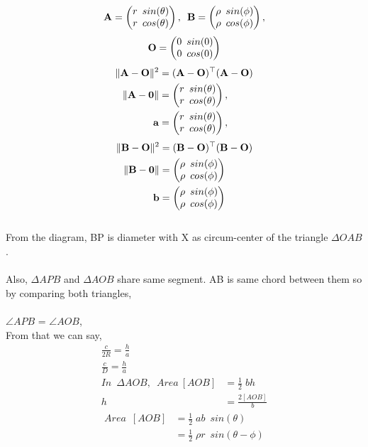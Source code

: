 \documentclass[journal,12pt,twocolumn]{IEEEtran}
\begin{document}
\begin{align}
\mathbf{A} = \begin{pmatrix}r\;\: sin(\theta)\\r \;\: cos(\theta)\end{pmatrix}, \;\: \nonumber \mathbf{B} =\begin{pmatrix}\rho \;\:  sin(\phi)\\\rho \;\: cos(\phi)\end{pmatrix}, \nonumber
\end{align}
\begin{align}
\mathbf{O} =\begin{pmatrix}0\;\: sin(0)\\0\;\: cos(0)\end{pmatrix} \nonumber
\end{align}
\begin{align}
\lVert\mathbf{A}-\mathbf{O}\rVert^2 &= (\mathbf{A}-\mathbf{O})^\top (\mathbf{A}-\mathbf{O}) \nonumber \\
\lVert\mathbf{A-0}\rVert &= \begin{pmatrix}r\;\: sin(\theta)\\r \;\: cos(\theta)\end{pmatrix}, \nonumber \\
\mathbf{a} &= \begin{pmatrix}r\;\: sin(\theta)\\r \;\: cos(\theta)\end{pmatrix}, \nonumber
\end{align}
\begin{align}
\lVert\mathbf{B}-\mathbf{O}\rVert^2 &= (\mathbf{B}-\mathbf{O})^\top (\mathbf{B}-\mathbf{O}) \nonumber \\
\lVert\mathbf{B-0}\rVert &= \begin{pmatrix}\rho \;\:  sin(\phi)\\\rho \;\: cos(\phi)\end{pmatrix} \nonumber \\
\mathbf{b} &= \begin{pmatrix}\rho \;\:  sin(\phi)\\\rho \;\: cos(\phi)\end{pmatrix} \nonumber
\end{align}\\
From the diagram, BP is diameter with X as circum-center of the triangle $\Delta OAB $.\\ \\
Also, $\Delta APB $ and $\Delta AOB $ share same segment. AB is same chord between them so by comparing both triangles,\\ \\
$\angle APB $ = $\angle AOB $,\\
From that we can say,
\begin{align}
\frac{c}{2R} = \frac{h}{a} \nonumber \\
\frac{c}{D} = \frac{h}{a} \\
In \;\: \Delta AOB,\;\: Area \:[AOB] &= \frac{1}{2}\;bh \nonumber \\ 
h &= \frac{2[AOB]}{b}
\end{align}
\begin{align}
Area \;\: [AOB] &= \frac{1}{2}\;ab\;\:sin(\theta)\nonumber \\ 
&= \frac{1}{2}\;\rho r\;\:sin(\theta-\phi)
\end{align}
\end{document}
